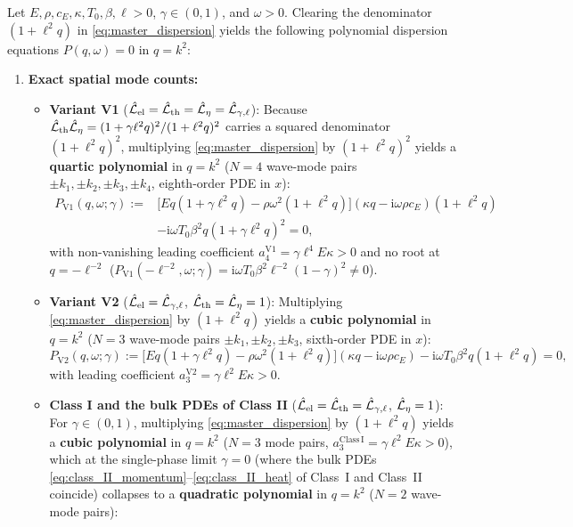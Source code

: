 \begin{theorem}[Mode Count $N=3$ vs.\ $N=4$ and Singular Limit $\gamma \to 0^+$]\label{thm:mode_count}
Let $E,\rho,c_E,\kappa,T_0,\beta,\ell > 0$, $\gamma \in (0,1)$, and $\omega > 0$. Clearing the denominator $(1+\ell^2 q)$ in \eqref{eq:master_dispersion} yields the following polynomial dispersion equations $P(q,\omega) = 0$ in $q = k^2$:
\begin{enumerate}[label=(\alph*),leftmargin=*]
  \item \textbf{Exact spatial mode counts:}
  \begin{itemize}[leftmargin=*]
    \item \textbf{Variant V1} ($\hat{\mathcal{L}}_{\mathrm{el}} = \hat{\mathcal{L}}_{\mathrm{th}} = \hat{\mathcal{L}}_\eta = \hat{\mathcal{L}}_{\gamma,\ell}$): Because $\hat{\mathcal{L}}_{\mathrm{th}}\hat{\mathcal{L}}_\eta = (1+\gamma\ell^2 q)^2/(1+\ell^2 q)^2$ carries a squared denominator $(1+\ell^2 q)^2$, multiplying \eqref{eq:master_dispersion} by $(1+\ell^2 q)^2$ yields a \textbf{quartic polynomial} in $q = k^2$ ($N=4$ wave-mode pairs $\pm k_1,\pm k_2,\pm k_3,\pm k_4$, eighth-order PDE in $x$):
    \begin{align}\label{eq:P_V1}
      P_{\mathrm{V1}}(q,\omega;\gamma) :={}& \big[E q(1+\gamma\ell^2 q) - \rho\omega^2(1+\ell^2 q)\big](\kappa q - \mathrm{i}\omega\rho c_E)(1+\ell^2 q) \nonumber\\
      &- \mathrm{i}\omega T_0\beta^2 q(1+\gamma\ell^2 q)^2 = 0,
    \end{align}
    with non-vanishing leading coefficient $a_4^{\mathrm{V1}} = \gamma\ell^4 E\kappa > 0$ and no root at $q = -\ell^{-2}$ ($P_{\mathrm{V1}}(-\ell^{-2},\omega;\gamma) = \mathrm{i}\omega T_0\beta^2\ell^{-2}(1-\gamma)^2 \neq 0$).
    \item \textbf{Variant V2} ($\hat{\mathcal{L}}_{\mathrm{el}} = \hat{\mathcal{L}}_{\gamma,\ell}$, $\hat{\mathcal{L}}_{\mathrm{th}} = \hat{\mathcal{L}}_\eta = 1$): Multiplying \eqref{eq:master_dispersion} by $(1+\ell^2 q)$ yields a \textbf{cubic polynomial} in $q = k^2$ ($N=3$ wave-mode pairs $\pm k_1,\pm k_2,\pm k_3$, sixth-order PDE in $x$):
    \begin{equation}\label{eq:P_V2}
      P_{\mathrm{V2}}(q,\omega;\gamma) := \big[E q(1+\gamma\ell^2 q) - \rho\omega^2(1+\ell^2 q)\big](\kappa q - \mathrm{i}\omega\rho c_E) - \mathrm{i}\omega T_0\beta^2 q(1+\ell^2 q) = 0,
    \end{equation}
    with leading coefficient $a_3^{\mathrm{V2}} = \gamma\ell^2 E\kappa > 0$.
    \item \textbf{Class I and the bulk PDEs of Class II} ($\hat{\mathcal{L}}_{\mathrm{el}} = \hat{\mathcal{L}}_{\mathrm{th}} = \hat{\mathcal{L}}_{\gamma,\ell}$, $\hat{\mathcal{L}}_\eta = 1$): For $\gamma \in (0,1)$, multiplying \eqref{eq:master_dispersion} by $(1+\ell^2 q)$ yields a \textbf{cubic polynomial} in $q = k^2$ ($N=3$ mode pairs, $a_3^{\mathrm{Class\,I}} = \gamma\ell^2 E\kappa > 0$), which at the single-phase limit $\gamma = 0$ (where the bulk PDEs \eqref{eq:class_II_momentum}--\eqref{eq:class_II_heat} of Class~I and Class~II coincide) collapses to a \textbf{quadratic polynomial} in $q = k^2$ ($N=2$ wave-mode pairs):

\end{itemize}
\end{enumerate}
\end{theorem}
